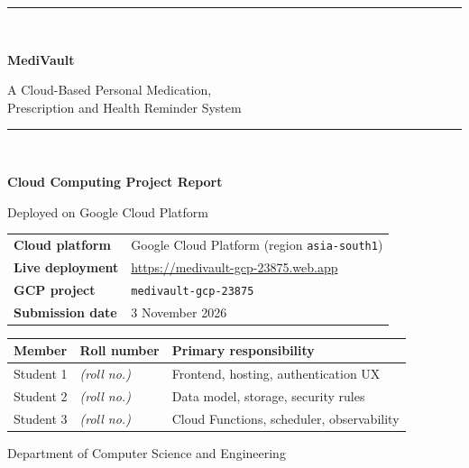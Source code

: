 \documentclass[11pt,a4paper]{report}
\newcommand{\projectid}{\texttt{medivault-gcp-23875}}
\newcommand{\appurl}{\url{https://medivault-gcp-23875.web.app}}
\begin{document}
\begin{titlepage}
\centering
\vspace*{1.2cm}
{\color{brand}\rule{\textwidth}{2pt}}\\[0.9cm]
{\Huge\bfseries\color{ink} MediVault\par}
\vspace{0.35cm}
{\Large\color{muted} A Cloud-Based Personal Medication,\\[2pt] Prescription and Health Reminder System\par}
\vspace{0.4cm}
{\color{brand}\rule{\textwidth}{2pt}}\\[1.4cm]

{\large\bfseries Cloud Computing Project Report\par}
\vspace{0.3cm}
{\large Deployed on Google Cloud Platform\par}

\vspace{1.8cm}
\begin{tabular}{ll}
\toprule
\textbf{Cloud platform} & Google Cloud Platform (region \texttt{asia-south1})\\
\textbf{Live deployment} & \appurl\\
\textbf{GCP project} & \projectid\\
\textbf{Submission date} & 3 November 2026\\
\bottomrule
\end{tabular}

\vspace{2.0cm}
\begin{tabular}{lll}
\toprule
\textbf{Member} & \textbf{Roll number} & \textbf{Primary responsibility}\\
\midrule
Student 1 & \textit{(roll no.)} & Frontend, hosting, authentication UX\\
Student 2 & \textit{(roll no.)} & Data model, storage, security rules\\
Student 3 & \textit{(roll no.)} & Cloud Functions, scheduler, observability\\
\bottomrule
\end{tabular}

\vfill
{\small\color{muted}Department of Computer Science and Engineering\par}
\end{titlepage}

\end{document}
